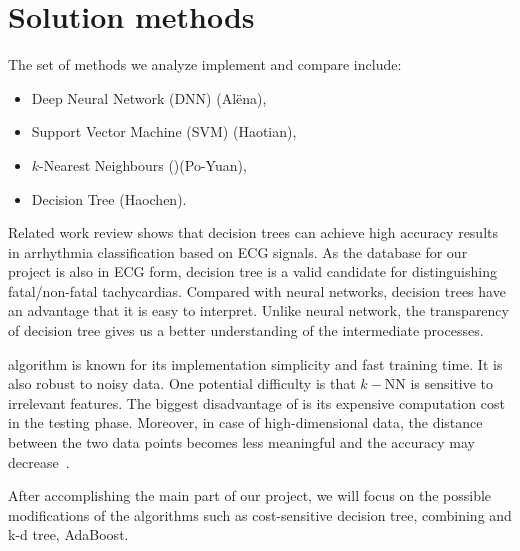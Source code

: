 \section{Solution methods}
\label{sec:methods}

The set of methods we analyze implement and compare include: 
\begin{itemize}
	\item Deep Neural Network (DNN) (Al\"ena),
	\item Support Vector Machine (SVM) (Haotian),
	\item $k$-Nearest Neighbours (\knn)(Po-Yuan),
	\item Decision Tree (Haochen).
\end{itemize}

Related work review shows that decision trees can achieve high 
accuracy results in arrhythmia classification based on ECG signals. 
As the database for our project is also in ECG form, decision tree is 
a valid candidate for distinguishing fatal/non-fatal tachycardias. 
Compared with neural networks, decision trees have an advantage that 
it is easy to interpret. 
Unlike neural network, the transparency of decision tree gives us a 
better understanding of the intermediate processes.
 
\knn algorithm is known for its implementation simplicity and fast 
training time. 
It is also robust to noisy data. 
One potential difficulty is that $k-$NN is sensitive to 
irrelevant features. 
The biggest disadvantage of \knn is its expensive computation cost in 
the testing phase. 
Moreover, in case of high-dimensional data, the distance between the 
two data points becomes less meaningful and the accuracy may 
decrease~\cite{beyer1999nearest}. 


After accomplishing the main part of our project, we will focus on 
the possible modifications of the algorithms such as cost-sensitive 
decision tree, combining \knn and k-d tree, AdaBoost. 
